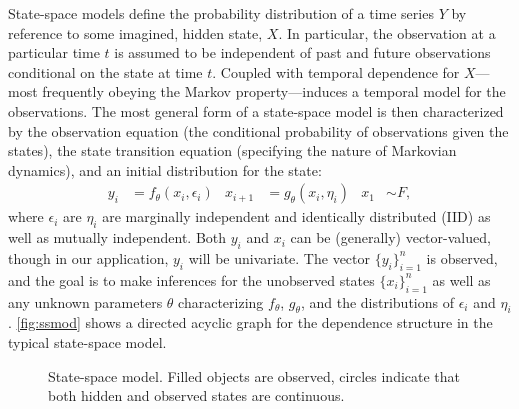 \documentclass[12pt]{article}
\begin{document}
State-space models define the probability distribution of a time 
series $Y$ by reference to some imagined, hidden state, $X$. In
particular, the observation at a particular time $t$ is assumed to be
independent of past and future observations conditional on the state
at time $t$. Coupled with temporal dependence for $X$---most
frequently obeying the Markov property---induces a temporal model for
the observations.  The most general form of a state-space model is
then characterized by the 
observation equation (the conditional probability of observations
given the states),
the state transition equation (specifying the nature of Markovian
dynamics), and an initial distribution for the state: 
\begin{equation}
\begin{aligned}
  y_i &= f_\theta(x_i,\epsilon_i) &
  x_{i+1} &= g_\theta(x_i,\eta_i) &
  x_1 &\sim F,
\end{aligned}
\label{eq:ssmod}
\end{equation}
where $\epsilon_i$ are $\eta_i$ are marginally independent and
identically distributed (IID) as well as mutually independent. Both
$y_i$ and $x_i$ can be (generally) vector-valued, though in our
application, $y_i$ will be univariate. The
vector $\{y_i\}_{i=1}^n$ is observed, and the goal is to make
inferences for the unobserved states $\{x_i\}_{i=1}^n$ as well as any
unknown parameters $\theta$ characterizing $f_\theta$, $g_\theta$, and
the distributions of $\epsilon_i$ and $\eta_i$.  \autoref{fig:ssmod}
shows a directed acyclic graph for the dependence structure in the
typical state-space model.

\begin{figure}
  \centering
  \caption{State-space model. Filled objects are observed, circles
    indicate that both hidden and observed states are
    continuous.\label{fig:ssmod}} 
\end{figure}
\end{document}
